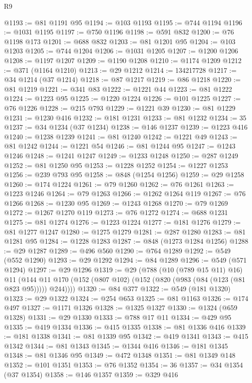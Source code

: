 \begin{lexlean}{R9}
\begin{coremodule}
@1193 := @81 @1191 @95
@1194 := @103 @1193
@1195 := @744 @1194
@1196 := @1031 @1195
@1197 := @750 @1196
@1198 := @591 @832
@1200 := @76 @1198 @173
@1201 := @688 @832
@1203 := @81 @1201 @95
@1204 := @103 @1203
@1205 := @744 @1204
@1206 := @1031 @1205
@1207 := @1200 @1206
@1208 := @1197 @1207
@1209 := @1190 @1208
@1210 := @1174 @1209
@1212 := @371 (@1164 @1210)
@1213 := @29 @1212
@1214 := 134217728
@1217 := @34 @1214 (@37 @1214)
@1218 := @87 @1217
@1219 := @86 @1218
@1220 := @81 @1219
@1221 := @341 @83
@1222 := @1221 @44
@1223 := @81 @1222
@1224 := @1223 @95
@1225 := @1220 @1224
@1226 := @101 @1225
@1227 := @76 @1226
@1228 := @215 @793
@1229 := @1221 @39
@1230 := @81 @1229
@1231 := @1230 @416
@1232 := @181 @1231
@1233 := @81 @1232
@1234 := 35
@1237 := @34 @1234 (@37 @1234)
@1238 := @146 @1237
@1239 := @1223 @416
@1240 := @1238 @1239
@1241 := @81 @1240
@1242 := @1221 @49
@1243 := @81 @1242
@1244 := @1221 @54
@1246 := @81 @1244 @95
@1247 := @1243 @1246
@1248 := @1241 @1247
@1249 := @1233 @1248
@1250 := @287 @1249
@1252 := @81 @1250 @95
@1253 := @1228 @1252
@1254 := @1227 @1253
@1256 := @239 @793 @95
@1258 := @848 (@1254 @1256)
@1259 := @29 @1258
@1260 := @174 @1224
@1261 := @79 @1260
@1262 := @76 @1261
@1263 := @1223 @1246
@1264 := @79 @1263
@1266 := @1262 @1264 @119
@1267 := @76 @1266
@1268 := @1230 @95
@1269 := @1243 @1268
@1270 := @79 @1269
@1272 := @1267 @1270 @119
@1273 := @76 @1272
@1274 := @688 @1231
@1275 := @81 @1274
@1276 := @1223 @1224
@1277 := @181 @1276
@1279 := @81 @1277 @1247
@1280 := @1275 @1279
@1281 := @287 @1280
@1283 := @81 @1281 @95
@1284 := @1228 @1283
@1287 := @848 (@1273 @1284 @1256)
@1288 := @29 @1287
@1289 := @496 @560
@1290 := @764 @1289
@1292 := @549 (@552 @1290)
@1293 := @29 @1292
@1294 := @84 @1289
@1296 := @549 (@571 @1294)
@1297 := @29 @1296
@1319 := @29
    (@788
      (@10 (@789 @15 @11) @16)
      @11
      (@144 @11 @170 (@152 (@807 @102) (@152 (@820 (@983 (@84 (@123 (@81 @823 @95))))) @244))))
@1320 := @84 @377
@1322 := @549 (@181 @1320)
@1323 := @29 @1322
@1324 := @254 @653
@1325 := @81 @1163
@1326 := @174 @497
@1327 := @1171 @1326
@1328 := @1325 @1327
@1330 := @1324 (@659 @1328)
@1331 := @29 @1330
@1333 := @788 @17 @11
@1334 := @429 @95
@1335 := @419 @1334
@1336 := @415 @1335
@1338 := @81 @1336 @416
@1339 := @181 @1338
@1341 := @81 @1339 @95
@1342 := @419 @1341
@1343 := @415 @1342
@1344 := @81 @1343
@1345 := @1344 @416
@1346 := @181 @1345
@1348 := @81 @1346 @95
@1349 := @472 @1348
@1351 := @81 @1349 @148
@1352 := @101 @1351
@1353 := @76 @1352
@1354 := 36
@1357 := @34 @1354 (@37 @1354)
@1358 := @146 @1357
@1359 := @329 @416

\end{coremodule}
\end{lexlean}
